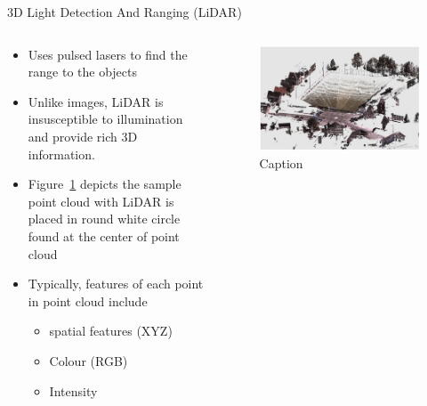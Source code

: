 \documentclass[aspectratio=169]{beamer}
\begin{document}
\begin{frame}{3D Light Detection And Ranging (LiDAR)}
    \begin{columns}
       \begin{column}{0.5\textwidth}
            \begin{itemize}
                \item Uses pulsed lasers to find the range to the objects
                \item Unlike images, LiDAR is insusceptible to illumination and provide rich 3D information.
                \item Figure~\ref{fig:sample_lidar_pc} depicts the sample point cloud with LiDAR is placed in round white circle found at the center of point cloud
                \item Typically, features of each point in point cloud include 
                \begin{itemize}
                    \item spatial features (XYZ)
                    \item Colour (RGB)
                    \item Intensity
                \end{itemize}
            \end{itemize}
       \end{column}
       \begin{column}{0.5\textwidth}
            \begin{figure}
                \centering
                \includegraphics[scale=0.25]{images/sample_LiDAR_PC.jpg}
                \caption{Caption}
                \label{fig:sample_lidar_pc}
            \end{figure}
       \end{column}
    \end{columns}
\end{frame}
\end{document}
